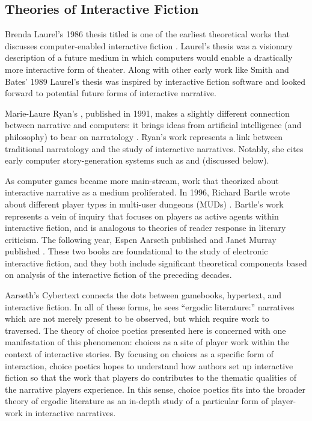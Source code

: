\subsection{Theories of Interactive Fiction}

Brenda Laurel's 1986 thesis titled  is one of the earliest theoretical works that discusses computer-enabled interactive fiction \citep{Laurel1986}.
%
Laurel's thesis was a visionary description of a future medium in which computers would enable a drastically more interactive form of theater.
%
Along with other early work like Smith and Bates' 1989  \citep{Smith1989} Laurel's thesis was inspired by interactive fiction software and looked forward to potential future forms of interactive narrative.


Marie-Laure Ryan's , published in 1991, makes a slightly different connection between narrative and computers: it brings ideas from artificial intelligence (and philosophy) to bear on narratology \citep{Ryan1991}.
%
Ryan's work represents a link between traditional narratology and the study of interactive narratives.
%
Notably, she cites early computer story-generation systems such as  and  (discussed below).


As computer games became more main-stream, work that theorized about interactive narrative as a medium proliferated. 
%
In 1996, Richard Bartle wrote about different player types in multi-user dungeons (MUDs) \citep{Bartle1996}.
%
Bartle's work represents a vein of inquiry that focuses on players as active agents within interactive fiction, and is analogous to theories of reader response in literary criticism.
%
The following year, Espen Aarseth published  and Janet Murray published  \citep{Aarseth1997,Murray1997}.
%
These two books are foundational to the study of electronic interactive fiction, and they both include significant theoretical components based on analysis of the interactive fiction of the preceding decades.


Aarseth's Cybertext connects the dots between gamebooks, hypertext, and interactive fiction.
%
In all of these forms, he sees ``ergodic literature:'' narratives which are not merely present to be observed, but which require work to traversed.
%
The theory of choice poetics presented here is concerned with one manifestation of this phenomenon: choices as a site of player work within the context of interactive stories.
%
By focusing on choices as a specific form of interaction, choice poetics hopes to understand how authors set up interactive fiction so that the work that players do contributes to the thematic qualities of the narrative players experience.
%
In this sense, choice poetics fits into the broader theory of ergodic literature as an in-depth study of a particular form of player-work in interactive narratives.


